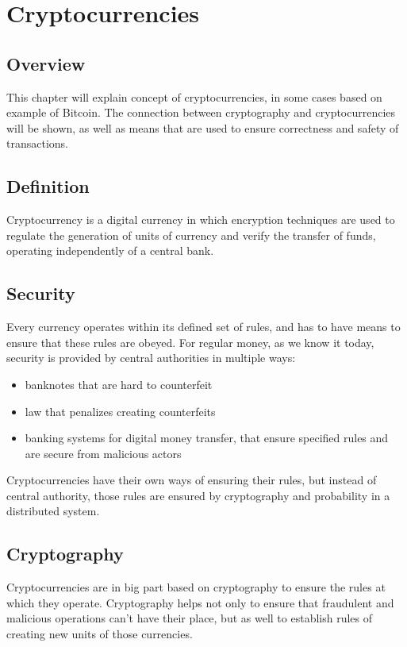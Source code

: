 \documentclass[12pt, en, eng, oneside]{mgr}
\begin{document}
\chapter{Cryptocurrencies}

\section{Overview}
This chapter will explain concept of cryptocurrencies, in some cases based on example of Bitcoin. The connection between cryptography and cryptocurrencies will be shown, as well as means that are used to ensure correctness and safety of transactions.

\section{Definition}
Cryptocurrency is a digital currency in which encryption techniques are used to regulate the generation of units of currency and verify the transfer of funds, operating independently of a central bank. \cite{crypto-def}

\section{Security}
Every currency operates within its defined set of rules, and has to have means to ensure that these rules are obeyed. For regular money, as we know it today, security is provided by central authorities in multiple ways:
\begin{itemize}
\item
banknotes that are hard to counterfeit
\item
law that penalizes creating counterfeits
\item
banking systems for digital money transfer, that ensure specified rules and are secure from malicious actors
\end{itemize}

Cryptocurrencies have their own ways of ensuring their rules, but instead of central authority, those rules are ensured by cryptography and probability in a distributed system.

\section{Cryptography}
Cryptocurrencies are in big part based on cryptography to ensure the rules at which they operate. Cryptography helps not only to ensure that fraudulent and malicious operations can't have their place, but as well to establish rules of creating new units of those currencies. 
\end{document}
